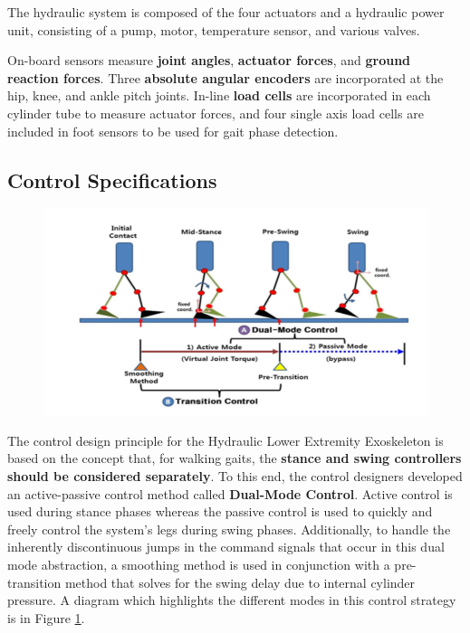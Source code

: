  The hydraulic system is composed of the four actuators and a hydraulic power unit, consisting of a pump, motor, temperature sensor, and various valves.
 
 On-board sensors measure \textbf{joint angles}, \textbf{actuator forces}, and \textbf{ground reaction forces}.  Three \textbf{absolute angular encoders} are incorporated at the hip, knee, and ankle pitch joints.  In-line \textbf{load cells} are incorporated in each cylinder tube to measure actuator forces, and four single axis load cells are included in foot sensors to be used for gait phase detection.
 
 \subsection{Control Specifications}
 
 \begin{figure}[thpb]
\centering
\includegraphics[width=5.in]{exos/figs/hydLowerExrem/dualModeDia}
  \caption{}
  \vspace{-0.2in}
 \label{fig:dualModeDia}   
 \end{figure}
The control design principle for the Hydraulic Lower Extremity Exoskeleton is based on the concept that, for walking gaits, the {\bf stance and swing controllers should be considered separately}.  To this end, the control designers developed an active-passive control method called {\bf Dual-Mode Control}.  Active control is used during stance phases whereas the passive control is used to quickly and freely control the system's legs during swing phases.  Additionally, to handle the inherently discontinuous jumps in the command signals that occur in this dual mode abstraction, a smoothing method is used in conjunction with a pre-transition method that solves for the swing delay due to internal cylinder pressure.  A diagram which highlights the different modes in this control strategy is in Figure \ref{fig:dualModeDia}.   

